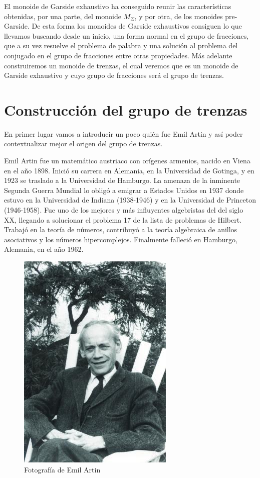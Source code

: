\documentclass[12pt]{book}
\theoremstyle{definition}
\begin{document}
El monoide de Garside exhaustivo ha conseguido reunir las características obtenidas, por una parte, del monoide $M_\Sigma$, y por otra, de los monoides pre-Garside. De esta forma los monoides de Garside exhaustivos consiguen lo que llevamos buscando desde un inicio, una forma normal en el grupo de fracciones, que a su vez resuelve el problema de palabra y una solución al problema del conjugado en el grupo de fracciones entre otras propiedades.
Más adelante construiremos un monoide de trenzas, el cual veremos que es un monoide de Garside exhaustivo y cuyo grupo de fracciones será el grupo de trenzas.



\chapter{Construcción del grupo de trenzas}
\label{sec:cons_grtr}
En primer lugar vamos a introducir un poco quién fue Emil Artin y así poder contextualizar mejor el origen del grupo de trenzas. 

Emil Artin fue un matemático austriaco con orígenes armenios, nacido en Viena en el año 1898. Inició su carrera en Alemania, en la Universidad de Gotinga, y en 1923 se traslado a la Universidad de Hamburgo. La amenaza de la inminente Segunda Guerra Mundial lo obligó a emigrar a Estados Unidos en 1937 donde estuvo en la Universidad de Indiana (1938-1946) y en la Universidad de Princeton (1946-1958). Fue uno de los mejores y más influyentes algebristas del del siglo XX, llegando a solucionar el problema 17 de la lista de problemas de Hilbert. Trabajó en la teoría de números, contribuyó a la teoría algebraica de anillos asociativos y los números hipercomplejos. Finalmente falleció en Hamburgo, Alemania, en el año 1962.

\begin{figure}[h!]
\centering
\includegraphics[scale=0.46]{imgs/EmilArtin.jpg} 
\caption{Fotografía de Emil Artin \cite{Emil}}
\label{img:pi_inverse}
\end{figure}
\end{document}
